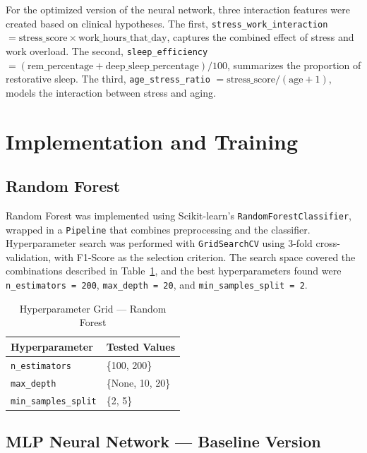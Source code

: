\documentclass[conference]{IEEEtran}
\begin{document}
For the optimized version of the neural network, three interaction features were created based on clinical hypotheses. The first, \texttt{stress\_work\_interaction} $= \text{stress\_score} \times \text{work\_hours\_that\_day}$, captures the combined effect of stress and work overload. The second, \texttt{sleep\_efficiency} $= (\text{rem\_percentage} + \text{deep\_sleep\_percentage}) / 100$, summarizes the proportion of restorative sleep. The third, \texttt{age\_stress\_ratio} $= \text{stress\_score} / (\text{age} + 1)$, models the interaction between stress and aging.

\section{Implementation and Training}

\subsection{Random Forest}

Random Forest was implemented using Scikit-learn's \texttt{RandomForestClassifier}, wrapped in a \texttt{Pipeline} that combines preprocessing and the classifier. Hyperparameter search was performed with \texttt{GridSearchCV} using 3-fold cross-validation, with F1-Score as the selection criterion. The search space covered the combinations described in Table~\ref{tab:rf_grid}, and the best hyperparameters found were \texttt{n\_estimators = 200}, \texttt{max\_depth = 20}, and \texttt{min\_samples\_split = 2}.

\begin{table}[!ht]
\caption{Hyperparameter Grid --- Random Forest}
\label{tab:rf_grid}
\centering
\begin{tabular}{ll}
\toprule
\textbf{Hyperparameter} & \textbf{Tested Values} \\
\midrule
\texttt{n\_estimators}      & \{100, 200\} \\
\texttt{max\_depth}          & \{None, 10, 20\} \\
\texttt{min\_samples\_split} & \{2, 5\} \\
\bottomrule
\end{tabular}
\end{table}

\subsection{MLP Neural Network --- Baseline Version}
\end{document}
